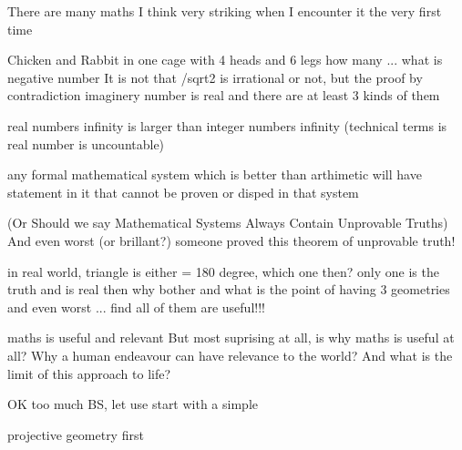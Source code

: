 \documentclass[letterpaper,10pt,english]{jupyterBook}
\begin{document}
\begin{sphinxVerbatim}[commandchars=\\\{\}]
There are many maths I think very striking when I encounter it the very first time

\PYGZhy{} Chicken and Rabbit in one cage with 4 heads and 6 legs how many ...
\PYGZhy{} what is negative number
\PYGZhy{} It is not that /sqrt\PYGZob{}2\PYGZcb{} is irrational or not, but the proof by contradiction
\PYGZhy{} imaginery number is real and there are at least 3 kinds of them

\PYGZhy{}\PYGZhy{}\PYGZhy{}\PYGZgt{} real number\PYGZsq{}s infinity is larger than integer number\PYGZsq{}s infinity
        (technical terms is real number is uncountable)

\PYGZhy{}\PYGZhy{}\PYGZhy{}\PYGZgt{} any formal mathematical system which is better than arthimetic will 
        have statement in it that cannot be proven or disped in that system
        
        (Or Should we say Mathematical Systems Always Contain Unprovable Truths)
        And even worst (or brillant?) someone proved this theorem of unprovable truth!
    
\PYGZhy{}\PYGZhy{}\PYGZhy{}\PYGZgt{} in real world, triangle is either \PYGZgt{}=\PYGZlt{} 180 degree, which one then?
        only one is the truth and is real
        then why bother and what is the point of having 3 geometries
        and even worst ... find all of them are useful!!!
    
\PYGZhy{}\PYGZhy{}\PYGZgt{} maths is useful and relevant 
        But most suprising at all, is why maths is useful at all?
        Why a human endeavour can have relevance to the world?
        And what is the limit of this approach to life?

OK too much BS, let use start with a simple 

\PYGZhy{}\PYGZhy{}\PYGZgt{} projective geometry first
\end{sphinxVerbatim}
\end{document}
